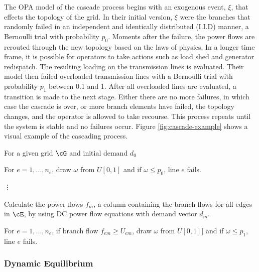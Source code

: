 The OPA model of the cascade process begins with an exogenous event, $\xi$, that effects the topology of the grid.  In their initial version, $\xi$ were the branches that randomly failed in an independent and identically distributed (I.I.D) manner, a Bernoulli trial with probability $p_0$.  Moments after the failure, the power flows are rerouted through the new topology based on the laws of physics.  In a longer time frame, it is possible for operators to take actions such as load shed and generator redispatch.  The resulting loading on the transmission lines is evaluated.  Their model then failed overloaded transmission lines with a Bernoulli trial with probability $p_1$ between  0.1 and 1.  After all overloaded lines are evaluated, a transition is made to the next stage.  Either there are no more failures, in which case the cascade is over, or more branch elements have failed, the topology changes, and the operator is allowed to take recourse.  This process repeats until the system is stable and no failures occur.  Figure \ref{fig:cascade-example} shows a visual example of the cascading process.

For a given grid $\cG$ and initial demand $d_0$
\begin{description}\label{fast_opa}
\item[ Initial $ \xi $ ]  For $e=1,...,n_e$, draw $\omega$ from $U[0,1]$ and if $\omega \le p_0$, line $e$ fails.
\item[ ] \hspace{35px} \vdots 
\item[ Stage $m$ ]  Calculate the power flows $f_{m}$, a column containing the branch flows for all edges in $\cE$, by using DC power flow equations with demand vector $d_m$. 

For $e=1,...,n_e$, if branch flow $f_{em} \ge U_{em}$, draw $\omega$ from $U[0,1]]$ and if $\omega \le p_1$, line $e$ fails.
\end{description}




\subsubsection{Dynamic Equilibrium}

